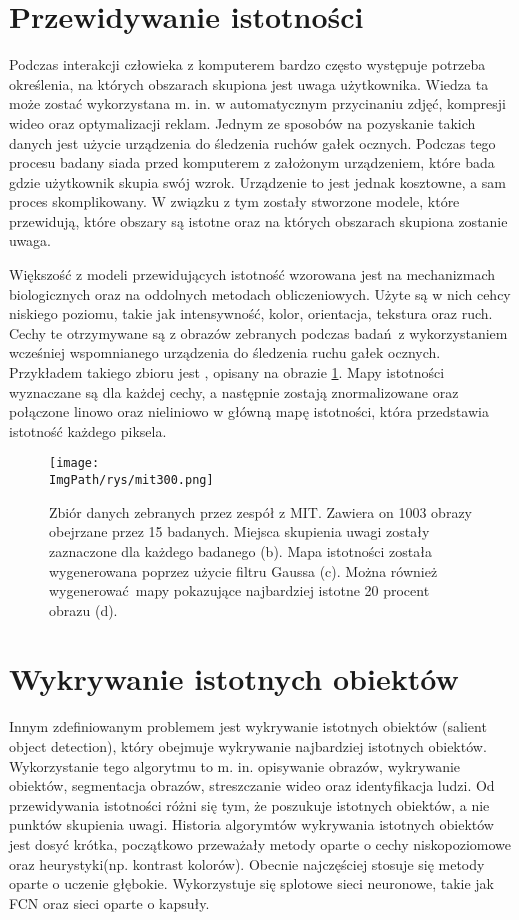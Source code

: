 \documentclass[a4paper,12pt,twoside,openany]{report}
\newcommand{\ImgPath}{.}
\begin{document}
	\section{Przewidywanie istotności}
	Podczas interakcji człowieka z komputerem bardzo często występuje potrzeba określenia, na których obszarach skupiona jest uwaga użytkownika. Wiedza ta może zostać wykorzystana m. in. w automatycznym przycinaniu zdjęć, kompresji wideo oraz optymalizacji reklam. Jednym ze sposobów na pozyskanie takich danych jest użycie urządzenia do śledzenia ruchów gałek ocznych. Podczas tego procesu badany siada przed komputerem z założonym urządzeniem, które bada gdzie użytkownik skupia swój wzrok. Urządzenie to jest jednak kosztowne, a sam proces skomplikowany. W związku z tym zostały stworzone modele, które przewidują, które obszary są istotne oraz na których obszarach skupiona zostanie uwaga.

	Większość z modeli przewidujących istotność wzorowana jest na mechanizmach biologicznych oraz na oddolnych metodach obliczeniowych. Użyte są w nich cehcy niskiego poziomu, takie jak intensywność, kolor, orientacja, tekstura oraz ruch. Cechy te otrzymywane są z obrazów zebranych podczas badań z wykorzystaniem wcześniej wspomnianego urządzenia do śledzenia ruchu gałek ocznych. Przykładem takiego zbioru jest \cite{Judd_2009}, opisany na obrazie \ref{mit}. Mapy istotności wyznaczane są dla każdej cechy, a następnie zostają znormalizowane oraz połączone linowo oraz nieliniowo w główną mapę istotności, która przedstawia istotność każdego piksela.

	\begin{figure}[h]
		\centering
		\texttt{[image: \\ImgPath/rys/mit300.png]}
		\caption{Zbiór danych zebranych przez zespół z MIT. Zawiera on 1003 obrazy obejrzane przez 15 badanych. Miejsca skupienia uwagi zostały zaznaczone dla każdego badanego (b). Mapa istotności została wygenerowana poprzez użycie filtru Gaussa (c). Można również wygenerować mapy pokazujące najbardziej istotne 20 procent obrazu (d).}
		\label{mit}
	\end{figure}

	\section{Wykrywanie istotnych obiektów}
	Innym zdefiniowanym problemem jest wykrywanie istotnych obiektów (salient object detection), który obejmuje wykrywanie najbardziej istotnych obiektów. Wykorzystanie tego algorytmu to m. in. opisywanie obrazów, wykrywanie obiektów, segmentacja obrazów, streszczanie wideo oraz identyfikacja ludzi. Od przewidywania istotności różni się tym, że poszukuje istotnych obiektów, a nie punktów skupienia uwagi. Historia algorymtów wykrywania istotnych obiektów jest dosyć krótka, początkowo przeważały metody oparte o cechy niskopoziomowe oraz heurystyki(np. kontrast kolorów). Obecnie najczęściej stosuje się metody oparte o uczenie głębokie. Wykorzystuje się splotowe sieci neuronowe, takie jak FCN oraz sieci oparte o kapsuły.
\end{document}
